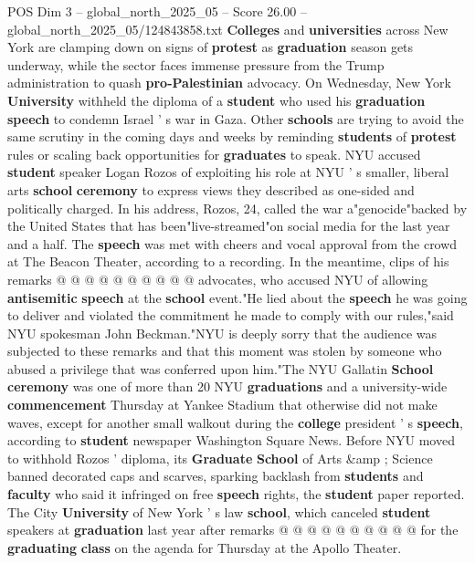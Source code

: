 \begin{textsample}{POS Dim 3 – global\_north\_2025\_05 – Score 26.00 – global\_north\_2025\_05/124843858.txt}  \label{ex:f3_pos_149}
\textbf{Colleges} and \textbf{universities} across New York are clamping down on signs of \textbf{protest} as \textbf{graduation} season gets underway, while the sector faces immense pressure from the Trump administration to quash \textbf{pro-Palestinian} advocacy.
On Wednesday, New York \textbf{University} withheld the diploma of a \textbf{student} who used his \textbf{graduation} \textbf{speech} to condemn Israel ' s war in Gaza.
Other \textbf{schools} are trying to avoid the same scrutiny in the coming days and weeks by reminding \textbf{students} of \textbf{protest} rules or scaling back opportunities for \textbf{graduates} to speak.
NYU accused \textbf{student} speaker Logan Rozos of exploiting his role at NYU ' s smaller, liberal arts \textbf{school} \textbf{ceremony} to express views they described as one-sided and politically charged.
In his address, Rozos, 24, called the war a"genocide"backed by the United States that has been"live-streamed"on social media for the last year and a half.
The \textbf{speech} was met with cheers and vocal approval from the crowd at The Beacon Theater, according to a recording.
In the meantime, clips of his remarks @ @ @ @ @ @ @ @ @ @ advocates, who accused NYU of allowing \textbf{antisemitic} \textbf{speech} at the \textbf{school} event."He lied about the \textbf{speech} he was going to deliver and violated the commitment he made to comply with our rules,"said NYU spokesman John Beckman."NYU is deeply sorry that the audience was subjected to these remarks and that this moment was stolen by someone who abused a privilege that was conferred upon him."The NYU Gallatin \textbf{School} \textbf{ceremony} was one of more than 20 NYU \textbf{graduations} and a university-wide \textbf{commencement} Thursday at Yankee Stadium that otherwise did not make waves, except for another small walkout during the \textbf{college} president ' s \textbf{speech}, according to \textbf{student} newspaper Washington Square News.
Before NYU moved to withhold Rozos ' diploma, its \textbf{Graduate} \textbf{School} of Arts \&amp ; Science banned decorated caps and scarves, sparking backlash from \textbf{students} and \textbf{faculty} who said it infringed on free \textbf{speech} rights, the \textbf{student} paper reported.
The City \textbf{University} of New York ' s law \textbf{school}, which canceled \textbf{student} speakers at \textbf{graduation} last year after remarks @ @ @ @ @ @ @ @ @ @ for the \textbf{graduating} \textbf{class} on the agenda for Thursday at the Apollo Theater.

\end{textsample}

